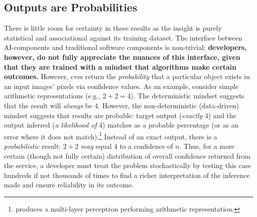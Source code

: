 \subsection{Outputs are Probabilities}
There is little room for certainty in these results as the insight is purely statistical and associational \citep{Pearl:2018uv} against its training dataset. The interface between AI-components and traditional software components is non-trivial; \textbf{developers, however, do not fully appreciate the nuances of this interface, given that they are trained with a mindset that algorithms make certain outcomes.}
However, \glspl{cvs} return the \textit{probability} that a particular object exists in an input images' pixels via confidence values.
As an example, consider simple arithmetic representations (e.g., $2+2=4$). The deterministic mindset suggests that the result will \textit{always} be 4. However, the non-deterministic (data-driven) mindset suggests that results are probable: target output (\textit{exactly} 4) and the output inferred (\textit{a likelihood of} 4) matches as a probable percentage (or as an error where it does not match).\footnote{\citet{Blake:1998vd} produces a multi-layer perceptron  performing arithmetic representation.} Instead of an exact output, there is a \textit{probabilistic} result: $2+2$ \textit{may} equal 4 to a confidence of $n$. 
Thus, for a more certain (though not fully certain) distribution of overall confidence returned from the service, a developer must treat the problem stochastically by testing this case hundreds if not thousands of times to find a richer interpretation of the inference made and ensure reliability in its outcome.

